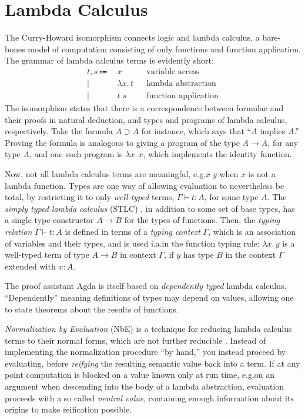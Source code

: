 \documentclass[12pt,twoside,openright]{report}
\numberwithin{equation}{chapter}
\numberwithin{figure}{chapter}
\numberwithin{table}{chapter}
\theoremstyle{definition}\newtheorem{definition}{Definition}
\begin{document}
\section{Lambda Calculus}

The Curry-Howard isomorphism \cite{howard80} connects logic and lambda calculus,
a bare-bones model of computation
consisting of only functions and function application.
The grammar of lambda calculus terms is evidently short:
\begin{align*}
  t, s \Coloneqq& \, x &&\text{variable access} \\
  \mid& \, \lambda x.\, t &&\text{lambda abstraction} \\
  \mid& \, t \; s &&\text{function application}
\end{align*}
The isomorphism states that there is a correspondence between
formulae and their proofs in natural deduction,
and types and programs of lambda calculus, respectively.
Take the formula $A \supset A$ for instance,
which says that ``$A$ implies $A$.''
Proving the formula is analogous to giving a program of the type $A \to A$,
for any type $A$,
and one such program is $\lambda x.\, x$,
which implements the identity function.

Now, not all lambda calculus terms are meaningful,
e.g.\@ $x \; y$ when $x$ is not a lambda function.
Types are one way of allowing evaluation to nevertheless be total,
by restricting it to only \emph{well-typed} terms,
$\Gamma \vdash t : A$, for some type $A$.
The \emph{simply typed lambda calculus} (STLC) \cite{church40},
in addition to some set of base types,
has a single type constructor $A \to B$ for the types of functions.
Then, the \emph{typing relation} $\Gamma \vdash t : A$ is defined
in terms of a \emph{typing context} $\Gamma$,
which is an association of variables and their types,
and is used i.a.\@ in the function typing rule:
$\lambda x.\, y$ is a well-typed term of type $A \to B$ in context $\Gamma$,
if $y$ has type $B$ in the context $\Gamma$ extended with $x : A$.

The proof assistant Agda \cite{norell07}
is itself based on \emph{dependently typed} lambda calculus.
``Dependently'' meaning definitions of types may depend on values,
allowing one to state theorems about the results of functions.

\emph{Normalization by Evaluation} (NbE) is a technique for
reducing lambda calculus terms to their normal forms,
which are not further reducible \cite{berger91}.
Instead of implementing the normalization procedure ``by hand,''
you instead proceed by evaluating,
before \emph{reifying} the resulting semantic value back into a term.
If at any point computation is blocked on a value known only at run time,
e.g.\@ on an argument when descending into the body of a lambda abstraction,
evaluation proceeds with a so called \emph{neutral value},
containing enough information about its origins to make reification possible.
\end{document}
